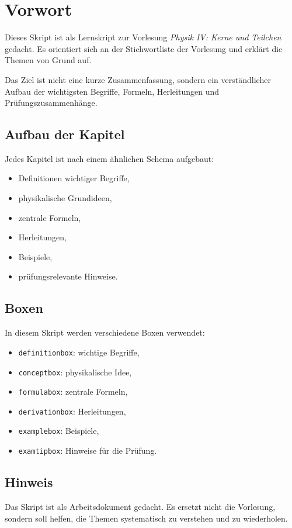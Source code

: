 \chapter*{Vorwort}

Dieses Skript ist als Lernskript zur Vorlesung \emph{Physik IV: Kerne und Teilchen}
gedacht. Es orientiert sich an der Stichwortliste der Vorlesung und erklärt die Themen
von Grund auf.

Das Ziel ist nicht eine kurze Zusammenfassung, sondern ein verständlicher Aufbau der
wichtigsten Begriffe, Formeln, Herleitungen und Prüfungszusammenhänge.

\section*{Aufbau der Kapitel}

Jedes Kapitel ist nach einem ähnlichen Schema aufgebaut:
\begin{itemize}
    \item Definitionen wichtiger Begriffe,
    \item physikalische Grundideen,
    \item zentrale Formeln,
    \item Herleitungen,
    \item Beispiele,
    \item prüfungsrelevante Hinweise.
\end{itemize}

\section*{Boxen}

In diesem Skript werden verschiedene Boxen verwendet:
\begin{itemize}
    \item \texttt{definitionbox}: wichtige Begriffe,
    \item \texttt{conceptbox}: physikalische Idee,
    \item \texttt{formulabox}: zentrale Formeln,
    \item \texttt{derivationbox}: Herleitungen,
    \item \texttt{examplebox}: Beispiele,
    \item \texttt{examtipbox}: Hinweise für die Prüfung.
\end{itemize}

\section*{Hinweis}

Das Skript ist als Arbeitsdokument gedacht. Es ersetzt nicht die Vorlesung,
sondern soll helfen, die Themen systematisch zu verstehen und zu wiederholen.